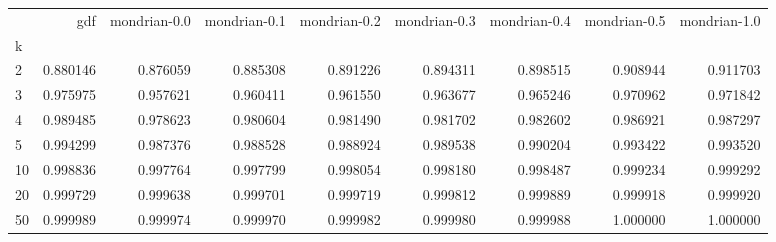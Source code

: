 \begin{tabular}{lrrrrrrrr}
\toprule
{} &       gdf &  mondrian-0.0 &  mondrian-0.1 &  mondrian-0.2 &  mondrian-0.3 &  mondrian-0.4 &  mondrian-0.5 &  mondrian-1.0 \\
k  &           &               &               &               &               &               &               &               \\
\midrule
2  &  0.880146 &      0.876059 &      0.885308 &      0.891226 &      0.894311 &      0.898515 &      0.908944 &      0.911703 \\
3  &  0.975975 &      0.957621 &      0.960411 &      0.961550 &      0.963677 &      0.965246 &      0.970962 &      0.971842 \\
4  &  0.989485 &      0.978623 &      0.980604 &      0.981490 &      0.981702 &      0.982602 &      0.986921 &      0.987297 \\
5  &  0.994299 &      0.987376 &      0.988528 &      0.988924 &      0.989538 &      0.990204 &      0.993422 &      0.993520 \\
10 &  0.998836 &      0.997764 &      0.997799 &      0.998054 &      0.998180 &      0.998487 &      0.999234 &      0.999292 \\
20 &  0.999729 &      0.999638 &      0.999701 &      0.999719 &      0.999812 &      0.999889 &      0.999918 &      0.999920 \\
50 &  0.999989 &      0.999974 &      0.999970 &      0.999982 &      0.999980 &      0.999988 &      1.000000 &      1.000000 \\
\bottomrule
\end{tabular}
